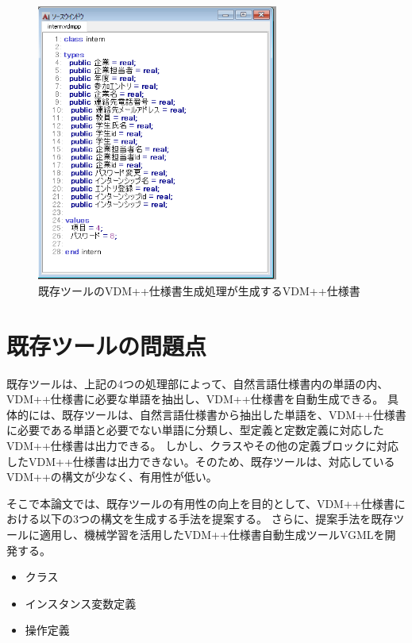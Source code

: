 \begin{figure}[tp]
    \begin{center}
        \includegraphics[width=300]{image/exis_vdm.png}
        \caption{既存ツールのVDM++仕様書生成処理が生成するVDM++仕様書}
        \label{fig:exis_vdm}
    \end{center}
\end{figure}

\section{既存ツールの問題点}
\label{sec:problem}
既存ツールは、上記の4つの処理部によって、自然言語仕様書内の単語の内、VDM++仕様書に必要な単語を抽出し、VDM++仕様書を自動生成できる。
具体的には、既存ツールは、自然言語仕様書から抽出した単語を、VDM++仕様書に必要である単語と必要でない単語に分類し、型定義と定数定義に対応したVDM++仕様書は出力できる。
しかし、クラスやその他の定義ブロックに対応したVDM++仕様書は出力できない。そのため、既存ツールは、対応しているVDM++の構文が少なく、有用性が低い。

そこで本論文では、既存ツールの有用性の向上を目的として、VDM++仕様書における以下の3つの構文を生成する手法を提案する。
さらに、提案手法を既存ツールに適用し、機械学習を活用したVDM++仕様書自動生成ツールVGMLを開発する。

\begin{itemize}
    \item クラス
    \item インスタンス変数定義
    \item 操作定義
\end{itemize}